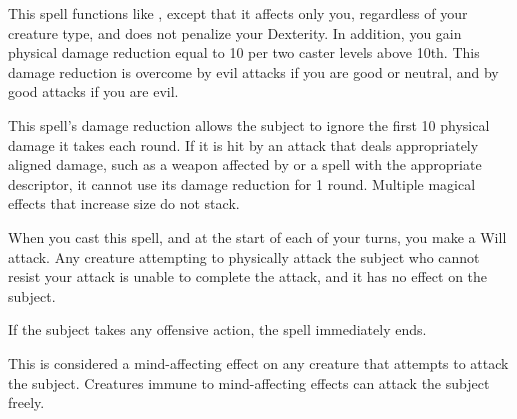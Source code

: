 \begin{spelleffect}
  This spell functions like , except that it affects only you, regardless of your creature type, and does not penalize your Dexterity. In addition, you gain physical damage reduction equal to 10  per two caster levels above 10th. This damage reduction is overcome by evil attacks if you are good or neutral, and by good attacks if you are evil.
\end{spelleffect}
\begin{spellnotes}
  This spell's damage reduction allows the subject to ignore the first 10 physical damage it takes each round. If it is hit by an attack that deals appropriately aligned damage, such as a weapon affected by  or a spell with the appropriate descriptor, it cannot use its damage reduction for 1 round.
  Multiple magical effects that increase size do not stack.
\end{spellnotes}

\spelldur{\durshort}
\begin{spelleffect}
    When you cast this spell, and at the start of each of your turns, you make a Will attack. Any creature attempting to physically attack the subject who cannot resist your attack is unable to complete the attack, and it has no effect on the subject.

If the subject takes any offensive action, the spell immediately ends.

\end{spelleffect}
\begin{spellnotes}
    This is considered a mind-affecting effect on any creature that attempts to attack the subject. Creatures immune to mind-affecting effects can attack the subject freely.
\end{spellnotes}

\begin{comment}
\subsubsection{S}
\end{comment}

